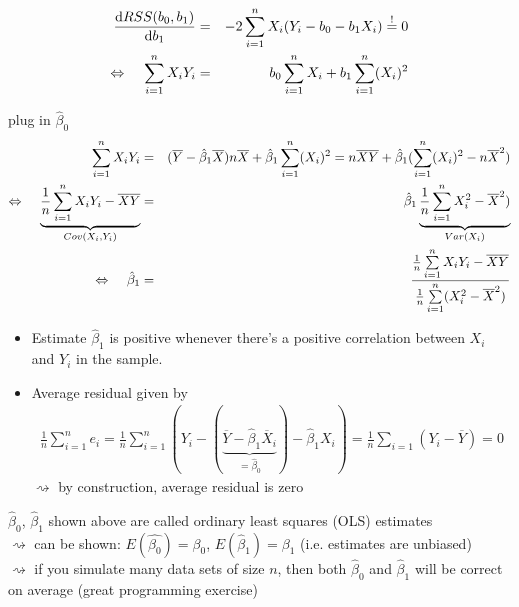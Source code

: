 \documentclass[11pt,a4paper,numbers=endperiod]{scrartcl}
\newcommand{\id}{\hspace*{4mm}}
\newcommand{\dif}{\mathrm{d}}
\begin{document}
\begin{eqnarray*}
	\frac{\dif RSS(b_0, b_1)}{\dif b_1} &=& -2 \sum\limits_{i = 1}^n X_i (Y_i - b_0 - b_1 X_i)\overset{!}{=} 0\\
	\Leftrightarrow \id \sum\limits_{i = 1}^n X_i Y_i &=& b_0  \sum\limits_{i = 1}^n X_i + b_1 \sum\limits_{i = 1}^n (X_i)^2\\
\end{eqnarray*}
{plug in $\hat{\beta}_0$
\begin{eqnarray*}
	\sum\limits_{i = 1}^n X_i Y_i &=& (\overline{Y} - \hat{\beta}_1 \overline{X}) n \overline{X} +  \hat{\beta}_1 \sum\limits_{i = 1}^n (X_i)^2 = n \overline{X} \overline{Y} + \hat{\beta}_1 (\sum\limits_{i = 1}^n (X_i)^2 - n \overline{X}^2)\\
	\Leftrightarrow \id \underbrace{\frac{1}{n} \sum\limits_{i = 1}^n X_iY_i - \overline{X} \overline{Y}}_{Cov(X_i, Y_i)} &=& \hat{\beta}_1 \underbrace{\frac{1}{n} \sum\limits_{i = 1}^n X_i^2 - \overline{X}^2)}_{Var(X_i)}\\
	\Leftrightarrow \id \hat{\beta}_1 &=& \frac{\frac{1}{n} \sum\limits_{i = 1}^n X_i Y_i - \overline{X} \overline{Y}}{\frac{1}{n} \sum\limits_{i = 1}^n (X_i^2 - \overline{X}^2)}
\end{eqnarray*}

\begin{itemize}
	\item Estimate $\hat{\beta}_1$ is positive whenever there's a positive correlation between $X_i$ and $Y_i$ in the sample.
	\item Average residual given by \begin{align*}
		\frac{1}{n} \sum\limits_{i = 1}^n e_i = \frac{1}{n} \sum\limits_{i = 1}^n (Y_i - (\underbrace{\overline{Y} - \hat{\beta}_1 \overline{X}_i}_{= \hat{\beta}_0}) - \hat{\beta}_1 X_i) = \frac{1}{n} \sum\limits_{i = 1} (Y_i - \overline{Y}) = 0
	\end{align*}
	$\rightsquigarrow$ by construction, average residual is zero
\end{itemize}
$\hat{\beta}_0$, $\hat{\beta}_1$ shown above are called ordinary least squares (OLS) estimates\\
$\rightsquigarrow$ can be shown: $E(\hat{\beta_0}) = \beta_0$, $E(\hat{\beta}_1) = \beta_1$ (i.e. estimates are unbiased)\\
$\rightsquigarrow$ if you simulate many data sets of size $n$, then both $\hat{\beta}_0$ and $\hat{\beta}_1$ will be correct on average (great programming exercise)\\

}
\end{document}
